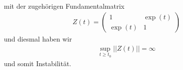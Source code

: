 \begin{solution}
\begin{enumerate}[label = \textbf{\alph*)}]
\begin{align*}
  \end{align*}
  mit der zugehörigen Fundamentalmatrix
  \begin{align*}
    Z(t) = \begin{pmatrix}
      1 & \exp(t) \\
      \exp(t) & 1
    \end{pmatrix}
  \end{align*}
  und diesmal haben wir
  \begin{align*}
    \sup_{t \geq t_0} ||Z(t)|| = \infty
  \end{align*}
  und somit Instabilität.
\end{enumerate}
\end{solution}
